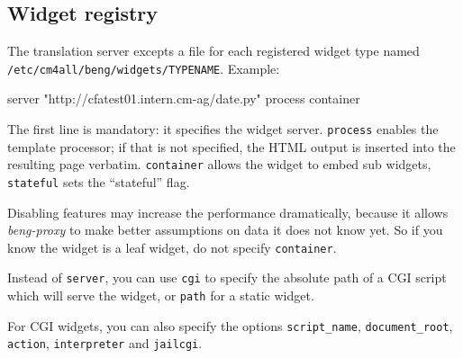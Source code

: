 \documentclass[a4paper,12pt]{article}
\begin{document}
\subsection{Widget registry}

The translation server excepts a file for each registered widget type
named \texttt{/etc/cm4all/beng/widgets/TYPENAME}.  Example:

\begin{verbatim*}
server "http://cfatest01.intern.cm-ag/date.py"
process
container
\end{verbatim*}

The first line is mandatory: it specifies the widget server.
\texttt{process} enables the template processor; if that is not
specified, the HTML output is inserted into the resulting page
verbatim.  \texttt{container} allows the widget to embed sub widgets,
\texttt{stateful} sets the ``stateful'' flag.

Disabling features may increase the performance dramatically, because
it allows \emph{beng-proxy} to make better assumptions on data it does
not know yet.  So if you know the widget is a leaf widget, do not
specify \texttt{container}.

Instead of \texttt{server}, you can use \texttt{cgi} to specify the
absolute path of a CGI script which will serve the widget, or
\texttt{path} for a static widget.

For CGI widgets, you can also specify the options
\texttt{script\_name}, \texttt{document\_root}, \texttt{action},
\texttt{interpreter} and \texttt{jailcgi}.
\end{document}

